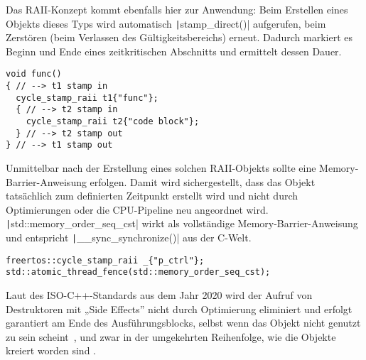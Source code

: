 Das RAII-Konzept kommt ebenfalls hier zur Anwendung: Beim Erstellen eines
Objekts dieses Typs wird automatisch \texttt|stamp_direct()|
aufgerufen, beim Zerstören (beim Verlassen des Gültigkeitsbereichs) erneut.
Dadurch markiert es Beginn und Ende eines zeitkritischen Abschnitts und
ermittelt dessen Dauer.

\begin{code}
\begin{verbatim}
void func()
{ // --> t1 stamp in
  cycle_stamp_raii t1{"func"};
  { // --> t2 stamp in
    cycle_stamp_raii t2{"code block"};
  } // --> t2 stamp out
} // --> t1 stamp out
\end{verbatim}
\end{code}

Unmittelbar nach der Erstellung eines solchen RAII-Objekts sollte eine
Memory-Barrier-Anweisung erfolgen. Damit wird sichergestellt, dass das Objekt
tatsächlich zum definierten Zeitpunkt erstellt wird und nicht durch
Optimierungen oder die CPU-Pipeline neu angeordnet wird.
\texttt|std::memory_order_seq_cst| wirkt als vollständige
Memory-Barrier-Anweisung~\cite{cppreference_memory_order} und entspricht
\texttt|__sync_synchronize()| aus der C-Welt.

\begin{code}
\begin{verbatim}
freertos::cycle_stamp_raii _{"p_ctrl"};
std::atomic_thread_fence(std::memory_order_seq_cst);
\end{verbatim}
\end{code}

Laut des ISO-C++-Standards aus dem Jahr 2020 wird der Aufruf von Destruktoren
mit „Side Effects”\footnotemark{} nicht durch Optimierung eliminiert und erfolgt
garantiert am Ende des Ausführungsblocks, selbst wenn das Objekt nicht genutzt
zu sein scheint~\cite[§6.7.5.4 Abs. 3]{iso_iec_14882_2020}, und zwar in der
umgekehrten Reihenfolge, wie die Objekte kreiert worden sind
\cite{isocpp_dtor_order}.



